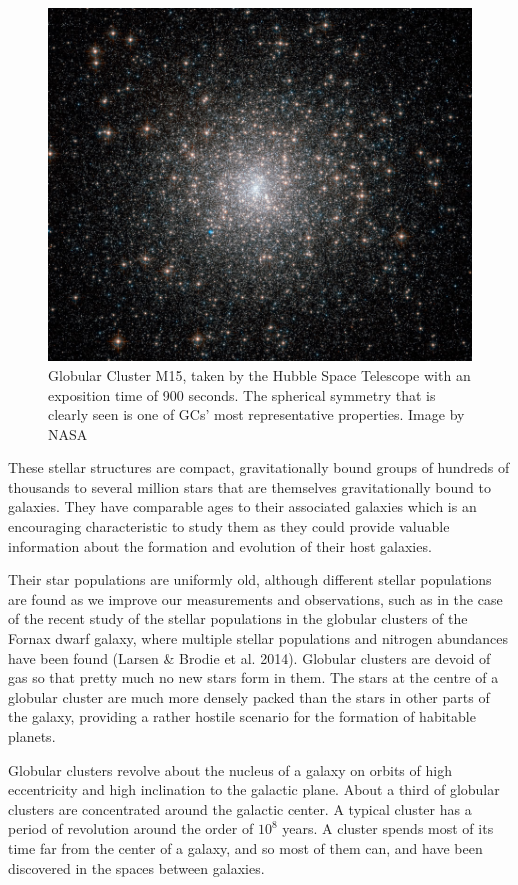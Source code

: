 \begin{figure}[H]
\centering
\includegraphics[width=12cm]{images/m15.jpg}
\caption[M15 Globular cluster]{Globular Cluster M15, taken by the Hubble Space Telescope with an exposition time of 900 seconds. The spherical symmetry  that is clearly seen is one of GCs' most representative properties. Image by NASA}
\end{figure}

These stellar structures are compact, gravitationally bound groups of hundreds of thousands to several million stars that are themselves gravitationally bound to galaxies. They have comparable ages to their associated galaxies which is an encouraging characteristic to study them as they could provide valuable information about the formation and evolution of their host galaxies.

Their star populations are uniformly old, although different stellar populations are found as we improve our measurements and observations, such as in the case of the recent study of the stellar populations in the globular clusters of the Fornax dwarf galaxy, where multiple stellar populations and nitrogen abundances have been found (Larsen \& Brodie et al. 2014). Globular clusters are devoid of gas so that pretty much no new stars form in them. The stars at the centre of a globular cluster are much more densely packed than the stars in other parts of the galaxy, providing a rather hostile scenario for the formation of habitable planets.

Globular clusters revolve about the nucleus of a galaxy on orbits of high eccentricity and high inclination to the galactic plane. About a third of globular clusters are concentrated around the galactic center. A typical cluster has a period of revolution around the order of $ 10^{8} $ years. A cluster spends most of its time far from the center of a galaxy, and so most of them can, and have been discovered in the spaces between galaxies. 

